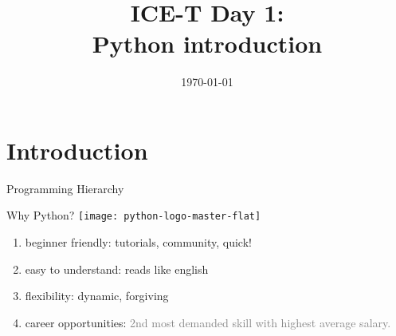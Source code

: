 \documentclass[xcolor=x11names,compress]{beamer}
\title[{\makebox[.5\paperwidth]{General Chemistry Recitation 1\hfill
       \insertframenumber/\inserttotalframenumber}}]{ICE-T Day 1:\\
Python introduction}
\author[\quad Amanda \quad\quad\quad\quad aed63@pitt.edu]{
}
\date{\small{\today}}
\renewcommand{\(}{\begin{columns}}
\renewcommand{\)}{\end{columns}}
\newcommand{\<}[1]{\begin{column}{#1}}
\renewcommand{\>}{\end{column}}
\begin{document}
\section{Introduction}
\begin{frame}
\titlepage
\end{frame}
\begin{frame}{Programming Hierarchy}
    \begin{center}
\end{center}
\end{frame}
    \begin{frame}{Why Python?}
\texttt{[image: python-logo-master-flat]}
\begin{enumerate}[label=$\bullet$]
\item<1-> \textcolor{darkcoral}{beginner friendly: } \textcolor<2->{gray!30}{tutorials, community, quick!}
\item<2-> \textcolor{darkcoral}{easy to understand:} \textcolor<3->{gray!30}{reads like english}
\item<3-> \textcolor{darkcoral}{flexibility:} \textcolor<4->{gray!30}{dynamic, forgiving}
\item<4-> \textcolor{darkcoral}{career opportunities:} \textcolor<5->{gray}{2nd most demanded skill with highest average salary.\cite{http://www.bestprogramminglanguagefor.me/why-learn-python}}
\end{enumerate}
\end{frame}
\end{document}
